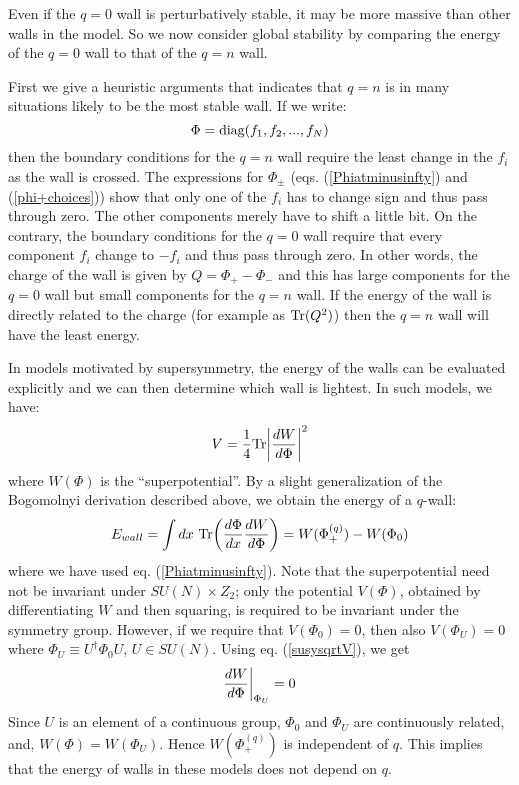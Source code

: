 \documentclass[a4paper,prd,nofootinbib,twocolumn,showpacs]{revtex4}
\begin{document}
Even if the $q=0$ wall is perturbatively stable, it may
be more massive than other walls in the model. So we now
consider global stability by comparing the energy of
the $q=0$ wall to that of the $q=n$ wall.

First we give a heuristic arguments that indicates that 
$q=n$ is in many situations likely to be the most stable 
wall. If we write:
\begin{equation}
\Phi = {\rm diag} (f_1, f_2,...,f_N)
\label{Phiinfrep}
\end{equation}
then the boundary conditions for the $q=n$ wall require the 
least change in the $f_i$ as the wall is crossed. The 
expressions for $\Phi_\pm$ (eqs. (\ref{Phiatminusinfty}) 
and (\ref{phi+choices})) show that only one of the $f_i$ 
has to change sign and thus pass through zero. The other 
components merely have to shift a little bit. On the contrary,
the boundary conditions for the $q=0$ wall require that every 
component $f_i$ change to $-f_i$ and thus pass through zero. 
In other words, the charge of the wall is given by 
$Q = \Phi_+ - \Phi_-$ and this has large components for 
the $q=0$ wall but small components for the $q=n$ wall. 
If the energy of the wall is directly related to the charge 
(for example as ${\rm Tr}(Q^2)$) then the $q=n$ wall will have 
the least energy.

In models motivated by supersymmetry, the energy of the walls 
can be evaluated explicitly and we can then determine which wall
is lightest. In such models, we have:
\begin{equation}
V = {1\over 4}{\rm Tr} \biggl | {{dW}\over {d\Phi}} \biggr |^2
\label{susysqrtV}
\end{equation}
where $W(\Phi )$ is the ``superpotential''. By a slight
generalization of the Bogomolnyi derivation described above,
we obtain the energy of a $q$-wall:
\begin{equation}
E_{wall} = 
  \int dx ~ {\rm Tr} \biggl ( 
  {{d\Phi}\over {dx}} {{dW}\over {d\Phi}} \biggr ) 
=  W(\Phi_+^{(q)}) - W (\Phi_0)  
\label{susywallenergy}
\end{equation}
where we have used eq. (\ref{Phiatminusinfty}). 
Note that the superpotential need not be invariant under 
$SU(N)\times Z_2$; only the potential $V(\Phi )$, obtained
by differentiating $W$ and then squaring, is required to be
invariant under the symmetry group. However, if we require
that $V(\Phi_0)=0$, then also $V(\Phi_U)=0$ where 
$\Phi_U \equiv U^\dag \Phi_0 U $, $U\in SU(N)$. Using
eq. (\ref{susysqrtV}), we get
\begin{equation}
{{dW}\over {d\Phi}} \bigg | _{\Phi_U}  =0 
\label{dWoverdPhi}
\end{equation}
Since $U$ is an element of a continuous group, $\Phi_0$ and 
$\Phi_U$ are continuously related, and, $W(\Phi) = W(\Phi_U)$. 
Hence $W(\Phi_+^{(q)})$ is independent of $q$. This implies
that the energy of walls in these models does not depend
on $q$. 
\end{document}
